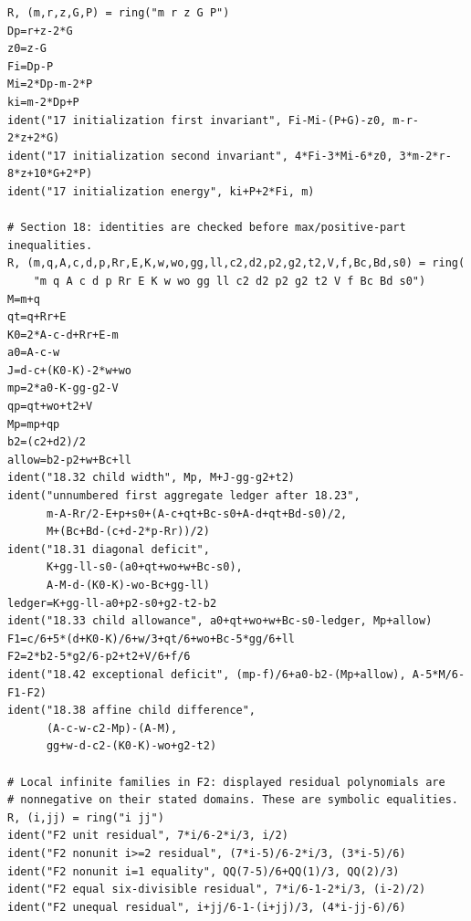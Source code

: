 \documentclass[12pt]{article}
\begin{document}
\begin{verbatim}
R, (m,r,z,G,P) = ring("m r z G P")
Dp=r+z-2*G
z0=z-G
Fi=Dp-P
Mi=2*Dp-m-2*P
ki=m-2*Dp+P
ident("17 initialization first invariant", Fi-Mi-(P+G)-z0, m-r-2*z+2*G)
ident("17 initialization second invariant", 4*Fi-3*Mi-6*z0, 3*m-2*r-8*z+10*G+2*P)
ident("17 initialization energy", ki+P+2*Fi, m)

# Section 18: identities are checked before max/positive-part inequalities.
R, (m,q,A,c,d,p,Rr,E,K,w,wo,gg,ll,c2,d2,p2,g2,t2,V,f,Bc,Bd,s0) = ring(
    "m q A c d p Rr E K w wo gg ll c2 d2 p2 g2 t2 V f Bc Bd s0")
M=m+q
qt=q+Rr+E
K0=2*A-c-d+Rr+E-m
a0=A-c-w
J=d-c+(K0-K)-2*w+wo
mp=2*a0-K-gg-g2-V
qp=qt+wo+t2+V
Mp=mp+qp
b2=(c2+d2)/2
allow=b2-p2+w+Bc+ll
ident("18.32 child width", Mp, M+J-gg-g2+t2)
ident("unnumbered first aggregate ledger after 18.23",
      m-A-Rr/2-E+p+s0+(A-c+qt+Bc-s0+A-d+qt+Bd-s0)/2,
      M+(Bc+Bd-(c+d-2*p-Rr))/2)
ident("18.31 diagonal deficit",
      K+gg-ll-s0-(a0+qt+wo+w+Bc-s0),
      A-M-d-(K0-K)-wo-Bc+gg-ll)
ledger=K+gg-ll-a0+p2-s0+g2-t2-b2
ident("18.33 child allowance", a0+qt+wo+w+Bc-s0-ledger, Mp+allow)
F1=c/6+5*(d+K0-K)/6+w/3+qt/6+wo+Bc-5*gg/6+ll
F2=2*b2-5*g2/6-p2+t2+V/6+f/6
ident("18.42 exceptional deficit", (mp-f)/6+a0-b2-(Mp+allow), A-5*M/6-F1-F2)
ident("18.38 affine child difference",
      (A-c-w-c2-Mp)-(A-M),
      gg+w-d-c2-(K0-K)-wo+g2-t2)

# Local infinite families in F2: displayed residual polynomials are
# nonnegative on their stated domains. These are symbolic equalities.
R, (i,jj) = ring("i jj")
ident("F2 unit residual", 7*i/6-2*i/3, i/2)
ident("F2 nonunit i>=2 residual", (7*i-5)/6-2*i/3, (3*i-5)/6)
ident("F2 nonunit i=1 equality", QQ(7-5)/6+QQ(1)/3, QQ(2)/3)
ident("F2 equal six-divisible residual", 7*i/6-1-2*i/3, (i-2)/2)
ident("F2 unequal residual", i+jj/6-1-(i+jj)/3, (4*i-jj-6)/6)


\end{verbatim}
\end{document}
